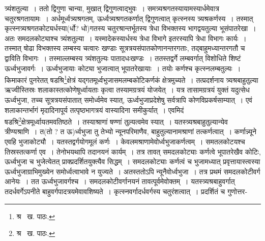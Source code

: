 \documentclass[11pt, openany]{book}
\begin{document}
\noindent त्र्यंशतुल्या~। ततो द्विगुणा चान्या, मुखात् द्विगुणत्वाद्भुवः~। समत्र्यश्रगतस्यायामस्यार्धमेवात्र चतुरश्रगतायामः~। अर्धमूर्ध्वत्र्यश्रगतम्, ऊर्ध्वत्र्यश्रगतकर्णात् द्विगुणत्वात् कृत्स्नस्य त्र्यश्रकर्णस्य~। तस्मात् कृत्स्नत्र्यश्रगतकोट्यर्धस्या(र्धो? धो)गतस्य चतुरश्रान्तर्भूतस्य त्रेधा विभक्तस्य भागद्वयतुल्या भूसंपातरेखा~। अतः समदलकोट्याश्च त्र्यंशतुल्या~। यस्मादेकस्यार्धस्य त्रेधा विभागे इतरस्यापि त्रेधा विभागः कार्यः~। तस्मात् षोढा विभक्तस्य लम्बस्य चत्वारः खण्डाः सूत्रत्रयसंपातकोणानन्तरगताः, तद्बाहुमध्यान्तरगतौ
च द्वाविति विभागः~। तस्माल्लम्बस्य त्र्यंशतुल्यः पातादधःखण्डः~। ततस्तद्वर्गे लम्बवर्गात् विशोधिते शिष्टं ऊर्ध्वभुजावर्गः~। ऊर्ध्वभुजायाः
कोट्या भुजात्वात् भूपातरेखायाः~। तयोः कर्णश्च कृत्स्नलम्बतुल्यः~। किमाकारं पुनरेतत् षडश्रि\renewcommand{\thefootnote}{१}\footnote{श्र \textendash\ ख. पाठः.}क्षेत्रं यद्गतमूर्ध्वभुजासमलम्बकोटिकर्णकं
क्षेत्रमुच्यते~। तत्प्रदर्शनाय त्र्यश्रबाहुतुल्या ऋज्वीस्तिस्रः शलाकास्तत्कोणेषूर्ध्वायताः कृत्वा तस्यामग्रत्रयं योजयेत्~। यत्र तासामग्रत्रयं युक्तं यदुत्सेध ऊर्ध्वभुजा, तच्च सूत्रत्रयसंपातात् समोर्ध्वमेव स्यात्, ऊर्ध्वभुजाप्रदेशेषु सर्वत्रापि कोणविप्रकर्षसाम्यात्~। एवं शलाकान्तर्भागं मृदादिनापूर्य तत्पृष्ठभागत्रयं वास्यादिना समीकुर्यात्~। एवमिदं षडश्रि\renewcommand{\thefootnote}{२}\footnote{श्र \textendash\ ख. पाठः.}क्षेत्रमूर्ध्वायतमवतिष्ठते~। तस्याश्राणां षण्णां तुल्यत्वमेव स्यात्~। यतस्त्र्यश्रबाहुतुल्यान्येव त्रीण्यश्राणि~। त(तो ? त ऊ)र्ध्वभुजा तु तेभ्यो न्यूनपरिमाणैव, बाहुतुल्यानामश्राणां तत्कर्णत्वात्~। कर्णान्न्यूने एवहि भुजाकोट्यौ~। यतस्तद्वर्गयोगमूलं कर्णः~। केवलमश्राणामेवोर्ध्वभुजाकर्णत्वम्~। समतलकोटयश्च तिस्रस्तत्कर्णा एव~। तेनोभयथापि तदानयनं कार्यम्~। तत्र तावत् समदलकोट्याः कर्णत्वे भूपातरेखैव कोटिः, ऊर्ध्वभुजा च भुजेत्येतत् प्राक्प्रदर्शितयुक्त्यैव सिद्धम्~। समदलकोट्याः कर्णत्वं च भुजामध्यात् प्रवृत्तायास्त्वस्या ऊर्ध्वभुजाग्राभिमुख्येन समोर्ध्वत्वाभावे न युज्यते~। अतस्ततोऽपि न्यूनैवोर्ध्वभुजा~। तत्र प्रथमं
समदलकोटीवर्ग आनेयः~। तत ऊर्ध्वभुजावर्गश्च~। समदलकोटीवर्गानयनं तावत्पूर्वमेवोक्तम्~। यतस्त्र्यश्रबाहुवर्गात् तदर्धवर्गेऽपनीते
बाहुवर्गपादत्रयमेवावशिष्यते~। कृत्स्नवर्गादर्धवर्गस्य चतुरंशत्वात्~। प्रदर्शितं च गुणोत्तर-

\newpage
\end{document}
